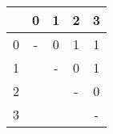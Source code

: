 \begin{tabular}{r|cccc}
	&	0	&	1	&	2	&	3	\\
\hline
0	&	-	&	0	&	1	&	1	\\
1	&		&	-	&	0	&	1	\\
2	&		&		&	-	&	0	\\
3	&		&		&		&	-	\\
\end{tabular}
